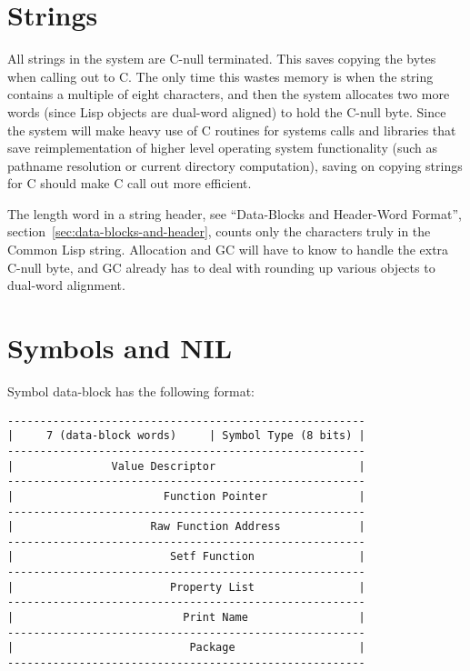 \section{Strings}

All strings in the system are C-null terminated.  This saves copying the bytes
when calling out to C.  The only time this wastes memory is when the string
contains a multiple of eight characters, and then the system allocates two more
words (since Lisp objects are dual-word aligned) to hold the C-null byte.
Since the system will make heavy use of C routines for systems calls and
libraries that save reimplementation of higher level operating system
functionality (such as pathname resolution or current directory computation),
saving on copying strings for C should make C call out more efficient.

The length word in a string header, see ``Data-Blocks and Header-Word
Format'', section~\ref{sec:data-blocks-and-header}, counts only the characters truly in the Common Lisp string.
Allocation and GC will have to know to handle the extra C-null byte, and GC
already has to deal with rounding up various objects to dual-word alignment.



\section{Symbols and NIL}

Symbol data-block has the following format:
\begin{verbatim}
-------------------------------------------------------
|     7 (data-block words)     | Symbol Type (8 bits) |
-------------------------------------------------------
|               Value Descriptor                      |
-------------------------------------------------------
|                       Function Pointer              |
-------------------------------------------------------
|                     Raw Function Address            |
-------------------------------------------------------
|                        Setf Function                |
-------------------------------------------------------
|                        Property List                |
-------------------------------------------------------
|                          Print Name                 |
-------------------------------------------------------
|                           Package                   |
-------------------------------------------------------
\end{verbatim}

